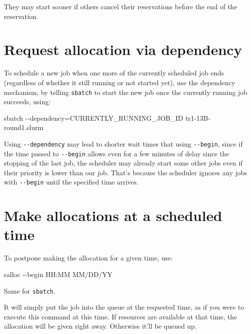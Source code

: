 \documentclass[
]{report}
\newenvironment{Shaded}{\begin{snugshade}}{\end{snugshade}}
\newcommand{\AttributeTok}[1]{\textcolor[rgb]{0.40,0.45,0.13}{#1}}
\newcommand{\ExtensionTok}[1]{\textcolor[rgb]{0.00,0.23,0.31}{#1}}
\newcommand{\NormalTok}[1]{\textcolor[rgb]{0.00,0.23,0.31}{#1}}
\newcommand{\OperatorTok}[1]{\textcolor[rgb]{0.37,0.37,0.37}{#1}}
\begin{document}
They may start sooner if others cancel their reservations before the end
of the reservation.

\section{Request allocation via
dependency}\label{request-allocation-via-dependency}

To schedule a new job when one more of the currently scheduled job ends
(regardless of whether it still running or not started yet), use the
dependency mechanism, by telling \texttt{sbatch} to start the new job
once the currently running job succeeds, using:

\begin{Shaded}
\begin{Highlighting}[]
\ExtensionTok{sbatch} \AttributeTok{{-}{-}dependency}\OperatorTok{=}\NormalTok{CURRENTLY\_RUNNING\_JOB\_ID tr1{-}13B{-}round1.slurm}
\end{Highlighting}
\end{Shaded}

Using \texttt{-\/-dependency} may lead to shorter wait times that using
\texttt{-\/-begin}, since if the time passed to \texttt{-\/-begin}
allows even for a few minutes of delay since the stopping of the last
job, the scheduler may already start some other jobs even if their
priority is lower than our job. That's because the scheduler ignores any
jobs with \texttt{-\/-begin} until the specified time arrives.

\section{Make allocations at a scheduled
time}\label{make-allocations-at-a-scheduled-time}

To postpone making the allocation for a given time, use:

\begin{Shaded}
\begin{Highlighting}[]
\ExtensionTok{salloc} \AttributeTok{{-}{-}begin}\NormalTok{ HH:MM MM/DD/YY}
\end{Highlighting}
\end{Shaded}

Same for \texttt{sbatch}.

It will simply put the job into the queue at the requested time, as if
you were to execute this command at this time. If resources are
available at that time, the allocation will be given right away.
Otherwise it'll be queued up.
\end{document}

